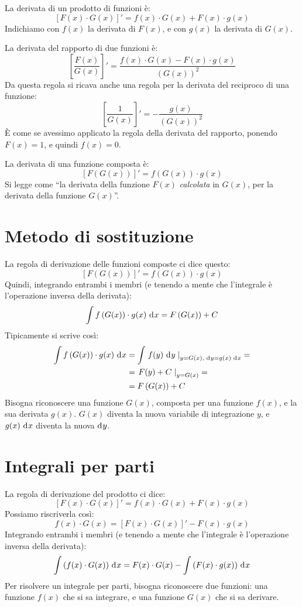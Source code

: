 La derivata di un prodotto di funzioni \`e:
\[
\left[ F(x) \cdot G(x) \right]' = 
f(x) \cdot G(x) + F(x) \cdot g(x)
\]
Indichiamo con $f(x)$ la derivata di $F(x)$, e con $g(x)$ la derivata 
di $G(x)$.

La derivata del rapporto di due funzioni \`e:
\[
\left[ \frac{F(x)}{G(x)} \right]' =
\frac{f(x) \cdot G(x) - F(x) \cdot g(x)}{\left(G(x)\right)^2}
\]
Da questa regola si ricava anche una regola per la derivata del
reciproco di una funzione:
\[
\left[ \frac{1}{G(x)} \right]' =
- \frac{g(x)}{\left(G(x)\right)^2}
\]
\`E come se avessimo applicato la regola della derivata del rapporto, 
ponendo $F(x) = 1$, e quindi $f(x) = 0$.

La derivata di una funzione composta \`e:
\[
\left[ F \left(G(x) \right) \right]' =
f \left( G(x) \right) \cdot g(x)
\]
Si legge come ``la derivata della funzione $F(x)$ \emph{calcolata} 
in $G(x)$, per la derivata della funzione $G(x)$''.

\section{Metodo di sostituzione}
La regola di derivazione delle funzioni composte ci dice questo:
\[
\left[ F \left(G(x) \right) \right]' =
f \left( G(x) \right) \cdot g(x)
\]
Quindi, integrando entrambi i membri (e tenendo a mente che l'integrale
\`e l'operazione inversa della derivata):
\[
\int f \left( G(x) \right) \cdot g(x) \dx =
F \left(G(x) \right) + C
\]
Tipicamente si scrive cos\`i:
\begin{align*}
\int f \left( G(x) \right) \cdot g(x) \dx &=
\int \substitute{f (y) \dx[y]}{y = G(x) ,\, \dx[y] = g(x) \dx} = \\
&= \substitute{F(y) + C}{y = G(x)} = \\
&= F \left( G(x) \right) + C
\end{align*}
Bisogna riconoscere una funzione $G(x)$, composta per una funzione $f(x)$,
e la sua derivata $g(x)$. $G(x)$ diventa la nuova variabile di integrazione
$y$, e $g(x) \dx$ diventa la nuova $\diff y$.

\section{Integrali per parti}

La regola di derivazione del prodotto ci dice:
\[
\left[ F(x) \cdot G(x) \right]' = 
f(x) \cdot G(x) + F(x) \cdot g(x)
\]
Possiamo riscriverla cos\`i:
\[
f(x) \cdot G(x) = 
\left[ F(x) \cdot G(x) \right]' - F(x) \cdot g(x)
\]
Integrando entrambi i membri (e tenendo a mente che l'integrale \`e
l'operazione inversa della derivata):
\[
\int \left( f(x) \cdot G(x) \right) \dx = F(x) \cdot G(x) - \int \left( F(x) \cdot g(x) \right) \dx
\]
Per risolvere un integrale per parti, bisogna riconoscere due funzioni:
una funzione $f(x)$ che si sa integrare, e una funzione $G(x)$ che si sa
derivare.

